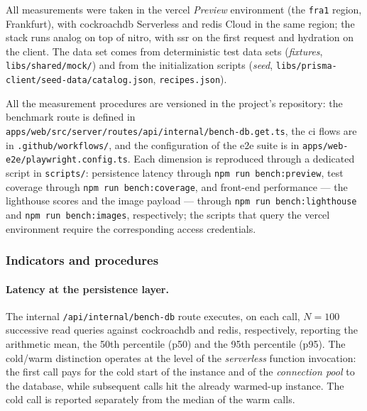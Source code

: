 All measurements were taken in the \gls{vercel} \textit{Preview} environment (the \texttt{fra1} region, Frankfurt), with \gls{cockroachdb} Serverless and \gls{redis} Cloud in the same region; the stack runs \gls{analog} on top of \gls{nitro}, with \acrshort{ssr} on the first request and \gls{hydration} on the client. The data set comes from deterministic test data sets (\textit{fixtures}, \texttt{libs/shared/mock/}) and from the initialization scripts (\textit{seed}, \texttt{libs/\allowbreak prisma-client/\allowbreak seed-data/\allowbreak catalog.json}, \texttt{recipes.json}).

All the measurement procedures are versioned in the project's repository: the benchmark route is defined in \texttt{apps/\allowbreak web/\allowbreak src/\allowbreak server/\allowbreak routes/\allowbreak api/\allowbreak internal/\allowbreak bench-db.get.ts}, the \acrshort{ci} flows are in \texttt{.github/workflows/}, and the configuration of the \acrshort{e2e} suite is in \texttt{apps/web-e2e/playwright.config.ts}. Each dimension is reproduced through a dedicated script in \texttt{scripts/}: persistence latency through \texttt{npm run bench:preview}, test coverage through \texttt{npm run bench:coverage}, and front-end performance --- the \gls{lighthouse} scores and the image payload --- through \texttt{npm run bench:lighthouse} and \texttt{npm run bench:images}, respectively; the scripts that query the \gls{vercel} environment require the corresponding access credentials.

\subsubsection{Indicators and procedures}\label{subsec:indicatori-proceduri}

\paragraph{Latency at the persistence layer.} The internal \texttt{/api/internal/bench-db} route executes, on each call, \(N=100\) successive read queries against \gls{cockroachdb} and \gls{redis}, respectively, reporting the arithmetic mean, the 50th percentile (\acrshort{p50}) and the 95th percentile (\acrshort{p95}). The cold/warm distinction operates at the level of the \textit{serverless} function invocation: the first call pays for the cold start of the instance and of the \textit{connection pool} to the database, while subsequent calls hit the already warmed-up instance. The cold call is reported separately from the median of the warm calls.

